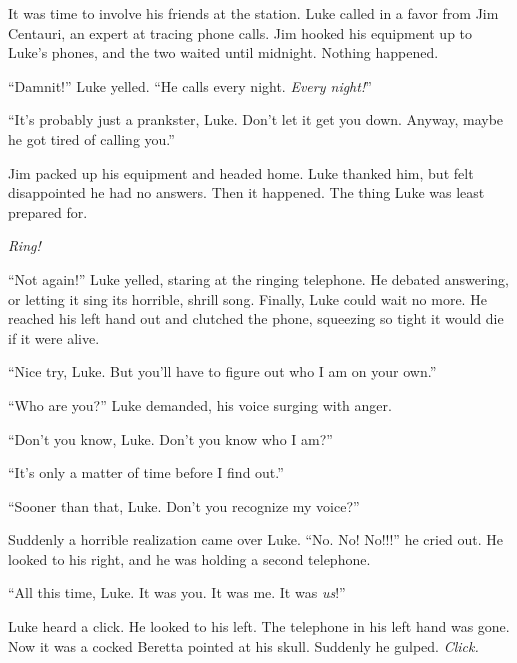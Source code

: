 It was time to involve his friends at the station. Luke called in a
favor from Jim Centauri, an expert at tracing phone calls. Jim
hooked his equipment up to Luke's phones, and the two waited until
midnight. Nothing happened.



``Damnit!'' Luke yelled. ``He calls every night. {\em Every
night!}''



``It's probably just a prankster, Luke. Don't let it get you down.
Anyway, maybe he got tired of calling you.''



Jim packed up his equipment and headed home. Luke thanked him, but
felt disappointed he had no answers. Then it happened. The thing
Luke was least prepared for.



{\em Ring!}



``Not again!'' Luke yelled, staring at the ringing telephone. He
debated answering, or letting it sing its horrible, shrill song.
Finally, Luke could wait no more. He reached his left hand out and
clutched the phone, squeezing so tight it would die if it were
alive.



``Nice try, Luke. But you'll have to figure out who I am on your
own.''



``Who are you?'' Luke demanded, his voice surging with anger.



``Don't you know, Luke. Don't you know who I am?''



``It's only a matter of time before I find out.''



``Sooner than that, Luke. Don't you recognize my voice?''



Suddenly a horrible realization came over Luke. ``No. No! No!!!'' he
cried out. He looked to his right, and he was holding a second
telephone.



``All this time, Luke. It was you. It was me. It was
{\em us}!''



Luke heard a click. He looked to his left. The telephone in his
left hand was gone. Now it was a cocked Beretta pointed at his
skull. Suddenly he gulped. {\em Click.} 


